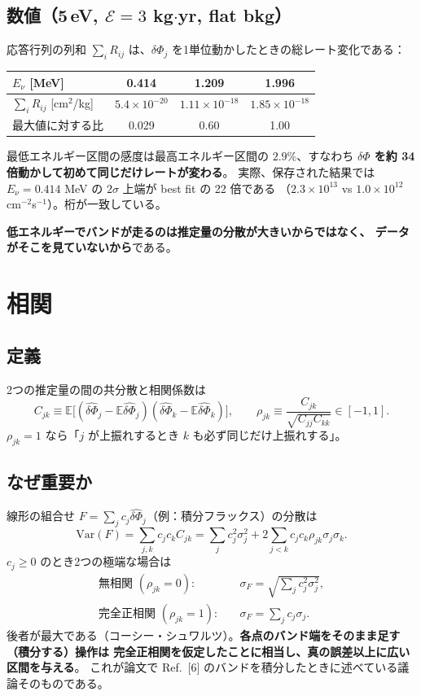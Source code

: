 \documentclass[11pt,a4paper]{ltjsarticle}
\newcommand{\dP}{\delta\Phi}
\newcommand{\dPh}{\widehat{\delta\Phi}}
\newcommand{\Ev}{E_\nu}
\newcommand{\E}{\mathbb{E}}
\newcommand{\Var}{\mathrm{Var}}
\begin{document}
\subsection*{数値（5\,eV, $\mathcal{E}=3$ kg$\cdot$yr, flat bkg）}
応答行列の列和 $\sum_i R_{ij}$ は、$\dP_j$ を1単位動かしたときの総レート変化である：
\begin{center}
\begin{tabular}{lccc}
\toprule
$\Ev$ [MeV] & 0.414 & 1.209 & 1.996 \\
\midrule
$\sum_i R_{ij}$ [cm$^2$/kg] & $5.4\times10^{-20}$ & $1.11\times10^{-18}$ & $1.85\times10^{-18}$\\
最大値に対する比 & 0.029 & 0.60 & 1.00\\
\bottomrule
\end{tabular}
\end{center}
最低エネルギー区間の感度は最高エネルギー区間の $2.9\%$、すなわち
\textbf{$\dP$ を約 34 倍動かして初めて同じだけレートが変わる}。
実際、保存された結果では $\Ev=0.414$ MeV の $2\sigma$ 上端が best fit の 22 倍である
（$2.3\times10^{13}$ vs $1.0\times10^{12}$ cm$^{-2}$s$^{-1}$）。桁が一致している。

\textbf{低エネルギーでバンドが走るのは推定量の分散が大きいからではなく、
データがそこを見ていないから}である。

\section{相関}

\subsection*{定義}
2つの推定量の間の共分散と相関係数は
\begin{equation}
C_{jk}\equiv\E\big[(\dPh_j-\E\dPh_j)(\dPh_k-\E\dPh_k)\big],
\qquad
\rho_{jk}\equiv\frac{C_{jk}}{\sqrt{C_{jj}C_{kk}}}\in[-1,1].
\end{equation}
$\rho_{jk}=1$ なら「$j$ が上振れするとき $k$ も必ず同じだけ上振れする」。

\subsection*{なぜ重要か}
線形の組合せ $F=\sum_j c_j\dPh_j$（例：積分フラックス）の分散は
\begin{equation}
\Var(F)=\sum_{j,k}c_jc_kC_{jk}
=\sum_j c_j^2\sigma_j^2+2\sum_{j<k}c_jc_k\rho_{jk}\sigma_j\sigma_k .
\end{equation}
$c_j\ge0$ のとき2つの極端な場合は
\begin{align}
\text{無相関 }(\rho_{jk}=0):&\quad \sigma_F=\sqrt{\textstyle\sum_j c_j^2\sigma_j^2},\\
\text{完全正相関 }(\rho_{jk}=1):&\quad \sigma_F=\sum_j c_j\sigma_j .
\end{align}
後者が最大である（コーシー・シュワルツ）。\textbf{各点のバンド端をそのまま足す（積分する）操作は
完全正相関を仮定したことに相当し、真の誤差以上に広い区間を与える}。
これが論文で Ref.~[6] のバンドを積分したときに述べている議論そのものである。
\end{document}
